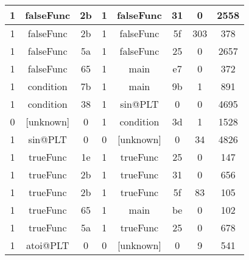 \begin{table} [!h]
\begin{threeparttable}
\begin{SingleSpace}
\begin{tabular}{| c | c | c | c | c | c | c | c |}
				1 & falseFunc & 2b & 1 & falseFunc & 31 & 0 &   2558 \\ \hline
				1 & falseFunc & 2b & 1 & falseFunc & 5f & 303 & 378 \\ \hline
				1 & falseFunc & 5a & 1 & falseFunc & 25 & 0 &   2657 \\ \hline
				1 & falseFunc & 65 & 1 & main &      e7 & 0 &   372 \\ \hline
				1 & condition & 7b & 1 & main &      9b & 1 &   891 \\ \hline
				1 & condition & 38 & 1 & sin@PLT &   0 &  0 &   4695 \\ \hline
				0 & [unknown] & 0 &  1 & condition & 3d & 1 &   1528 \\ \hline
				1 & sin@PLT &   0 &  0 & [unknown] & 0 &  34 &  4826 \\ \hline
				1 & trueFunc &  1e & 1 & trueFunc &  25 & 0 &   147 \\ \hline
				1 & trueFunc &  2b & 1 & trueFunc &  31 & 0 &   656 \\ \hline
				1 & trueFunc &  2b & 1 & trueFunc &  5f & 83 &  105 \\ \hline
				1 & trueFunc &  65 & 1 & main &      be & 0 &   102 \\ \hline
				1 & trueFunc &  5a & 1 & trueFunc &  25 & 0 &   678 \\ \hline
				1 & atoi@PLT &  0 &  0 & [unknown] & 0 &  9 &   541 \\ \hline

            \end{tabular}%
        \end{SingleSpace}
    \end{threeparttable}
\end{table}

